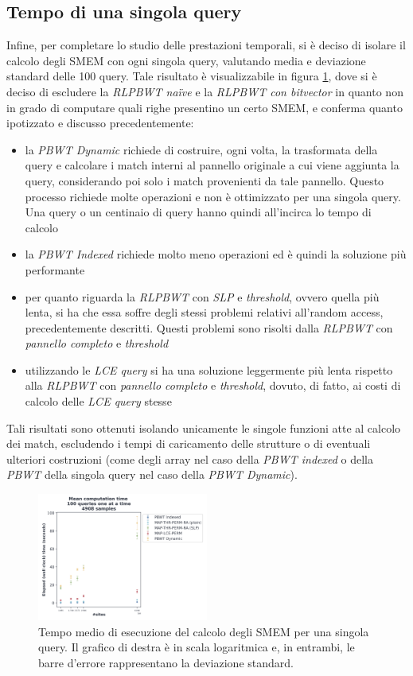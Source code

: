 \subsection{Tempo di una singola query}
Infine, per completare lo studio delle prestazioni temporali, si è deciso di
isolare il calcolo degli SMEM con ogni singola query, valutando media e
deviazione standard delle 100 query. Tale risultato è visualizzabile in figura
\ref{fig:smemsinglechr}, dove si è deciso di escludere la \textit{RLPBWT
  na\"{i}ve} e la \textit{RLPBWT con bitvector} in quanto non in grado di
computare quali righe presentino un certo SMEM, e conferma quanto ipotizzato e
discusso precedentemente: 
\begin{itemize}
  \item la \textit{PBWT Dynamic} richiede di costruire, ogni volta, la
  trasformata della query e
  calcolare i match interni al pannello originale a cui viene
  aggiunta la query, considerando poi solo i match provenienti da tale
  pannello. Questo processo richiede molte operazioni e non è ottimizzato per 
  una singola query. Una query o un centinaio di query hanno quindi all'incirca
  lo tempo di calcolo
  \item la \textit{PBWT Indexed} richiede molto meno operazioni ed è quindi la
  soluzione più performante
  \item per quanto riguarda la \textit{RLPBWT} con \textit{SLP} e
  \textit{threshold}, ovvero quella più lenta, si ha che essa soffre
  degli stessi problemi relativi all'random access, precedentemente
  descritti. Questi problemi sono risolti dalla \textit{RLPBWT} con
  \textit{pannello completo} e \textit{threshold}
  \item  utilizzando le \textit{LCE query} si ha una soluzione leggermente più
  lenta rispetto alla \textit{RLPBWT} con
  \textit{pannello completo} e \textit{threshold}, dovuto, di fatto, ai costi
  di calcolo delle \textit{LCE query} stesse
\end{itemize}
Tali risultati sono ottenuti isolando unicamente le singole funzioni atte al
calcolo dei match, escludendo i tempi di caricamento delle strutture o di
eventuali ulteriori costruzioni (come degli array nel caso della \textit{PBWT
  indexed} o della \textit{PBWT} della singola query nel caso della \textit{PBWT
Dynamic}).
\begin{figure}
  \centering
  \includegraphics[width=0.5\textwidth]{img/exe_single_time_dyn_paper.png}
  \caption{Tempo medio di esecuzione del calcolo degli SMEM per una singola
    query. Il grafico di destra è in scala logaritmica e, in entrambi, le
    barre d'errore rappresentano la deviazione standard.}
  \label{fig:smemsinglechr}
\end{figure}

